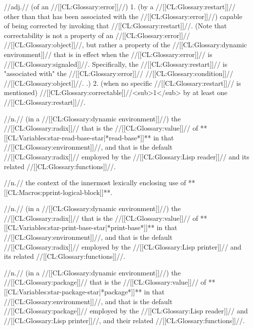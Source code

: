  //adj.// (of an //[[CL:Glossary:error]]//) 1. (by a //[[CL:Glossary:restart]]// other than  that has been associated with the //[[CL:Glossary:error]]//) capable of being corrected by invoking that //[[CL:Glossary:restart]]//. 
 (Note that correctability is not a property of an //[[CL:Glossary:error]]// //[[CL:Glossary:object]]//, but rather a property of the //[[CL:Glossary:dynamic environment]]// that is in effect when the //[[CL:Glossary:error]]// is //[[CL:Glossary:signaled]]//. Specifically, the //[[CL:Glossary:restart]]// is "associated with" the //[[CL:Glossary:error]]// //[[CL:Glossary:condition]]// //[[CL:Glossary:object]]//. \Seesection\AssocRestartWithCond.) 2. (when no specific //[[CL:Glossary:restart]]// is mentioned) //[[CL:Glossary:correctable]]//<sub>1</sub> by at least one //[[CL:Glossary:restart]]//. 

 //n.// (in a //[[CL:Glossary:dynamic environment]]//) the //[[CL:Glossary:radix]]// that is the //[[CL:Glossary:value]]// of **[[CL:Variables:star-read-base-star|*read-base*]]** in that //[[CL:Glossary:environment]]//, and that is the default //[[CL:Glossary:radix]]// employed by the //[[CL:Glossary:Lisp reader]]// and its related //[[CL:Glossary:functions]]//.

 //n.// the context of the innermost lexically enclosing use of **[[CL:Macros:pprint-logical-block]]**.

 //n.// (in a //[[CL:Glossary:dynamic environment]]//) the //[[CL:Glossary:radix]]// that is the //[[CL:Glossary:value]]// of **[[CL:Variables:star-print-base-star|*print-base*]]** in that //[[CL:Glossary:environment]]//, and that is the default //[[CL:Glossary:radix]]// employed by the //[[CL:Glossary:Lisp printer]]// and its related //[[CL:Glossary:functions]]//.

 //n.// (in a //[[CL:Glossary:dynamic environment]]//) the //[[CL:Glossary:package]]// that is the //[[CL:Glossary:value]]// of **[[CL:Variables:star-package-star|*package*]]** in that //[[CL:Glossary:environment]]//, and that is the default //[[CL:Glossary:package]]// employed by the //[[CL:Glossary:Lisp reader]]// and //[[CL:Glossary:Lisp printer]]//, and their related //[[CL:Glossary:functions]]//.

